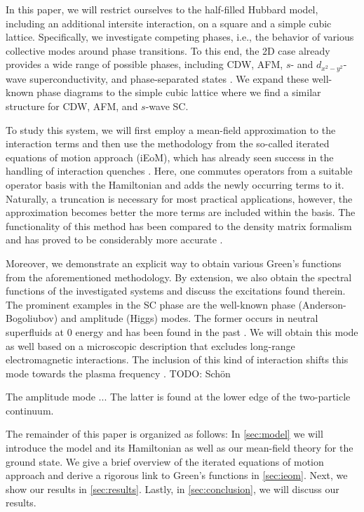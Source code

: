 \documentclass[
    reprint, 
    aps,
    preprintnumbers,
    twocolumn,
    prb,
    superscriptaddress
]{revtex4-2}
\begin{document}
In this paper, we will restrict ourselves to the half-filled Hubbard model, including an additional intersite interaction, on a square and a simple cubic lattice.
Specifically, we investigate competing phases, i.e., the behavior of various collective modes around phase transitions.
To this end, the 2D case already provides a wide range of possible phases, including CDW, AFM, $s$- and $d_{x^2 - y^2}$-wave superconductivity, and phase-separated states \cite{Micnas88b,Tsuchiura95,Su01,Su04,ha11,Huang13,Jiang22,Linner23}.
We expand these well-known phase diagrams to the simple cubic lattice where we find a similar structure for CDW, AFM, and $s$-wave SC.

To study this system, we will first employ a mean-field approximation to the interaction terms 
and then use the methodology from the so-called iterated equations of motion approach (iEoM),
which has already seen success in the handling of interaction quenches \cite{uhrig09,hamerla13,hamerla14,bleicker18}.
Here, one commutes operators from a suitable operator basis with the Hamiltonian and adds the newly occurring terms to it.
Naturally, a truncation is necessary for most practical applications, however, the approximation becomes better the more terms are included within the basis.
The functionality of this method has been compared to the density matrix formalism and has proved to be considerably more accurate \cite{Kalthoff17}.

Moreover, we demonstrate an explicit way to obtain various Green's functions from the aforementioned methodology.
By extension, we also obtain the spectral functions of the investigated systems and discuss the excitations found therein.
The prominent examples in the SC phase are the well-known phase (Anderson-Bogoliubov) and amplitude (Higgs) modes.
The former occurs in neutral superfluids at $0$ energy and has been found in the past \cite{Maiti2015,Sun2020,Fan22}.
We will obtain this mode as well based on a microscopic description that excludes long-range electromagnetic interactions.
The inclusion of this kind of interaction shifts this mode towards the plasma frequency \cite{Kulik1981}. TODO: Schön

The amplitude mode ... \cite{Varma02,Cea14,Measson14,Tsuji15,Krull16,Schwarz20}
The latter is found at the lower edge of the two-particle continuum.


The remainder of this paper is organized as follows:
In \autoref{sec:model} we will introduce the model and its Hamiltonian as well as our mean-field theory for the ground state.
We give a brief overview of the iterated equations of motion approach and derive a rigorous link to Green's functions in \autoref{sec:ieom}.
Next, we show our results in \autoref{sec:results}.
Lastly, in \autoref{sec:conclusion}, we will discuss our results.
\end{document}
